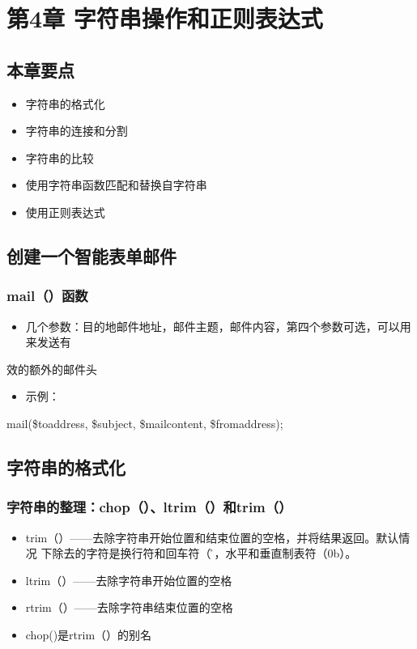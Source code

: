\documentclass[11pt]{article}
\begin{document}
\section{第4章 字符串操作和正则表达式}
\label{sec:org4b6f239}
\subsection{本章要点}
\label{sec:org8b5b692}
\begin{itemize}
\item 字符串的格式化
\item 字符串的连接和分割
\item 字符串的比较
\item 使用字符串函数匹配和替换自字符串
\item 使用正则表达式
\end{itemize}
\subsection{创建一个智能表单邮件}
\label{sec:org61ce980}
\subsubsection{mail（）函数}
\label{sec:orgdb559d2}
\begin{itemize}
\item 几个参数：目的地邮件地址，邮件主题，邮件内容，第四个参数可选，可以用来发送有
\end{itemize}
效的额外的邮件头
\begin{itemize}
\item 示例：
\end{itemize}
mail(\$toaddress, \$subject, \$mailcontent, \$fromaddress);
\subsection{字符串的格式化}
\label{sec:orgdf0838a}
\subsubsection{字符串的整理：chop（）、ltrim（）和trim（）}
\label{sec:org6f7306c}
\begin{itemize}
\item trim（）——去除字符串开始位置和结束位置的空格，并将结果返回。默认情况
下除去的字符是换行符和回车符（\r），水平和垂直制表符（\x0b）。
\item ltrim（）——去除字符串开始位置的空格
\item rtrim（）——去除字符串结束位置的空格
\item chop()是rtrim（）的别名
\end{itemize}
\end{document}
